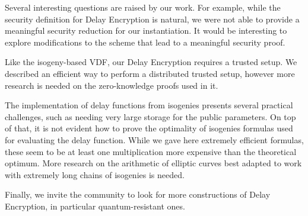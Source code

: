 \documentclass{llncs}
\begin{document}
Several interesting questions are raised by our work. %
For example, while the security definition for Delay Encryption is
natural, we were not able to provide a meaningful security reduction
for our instantiation. %
It would be interesting to explore modifications to the scheme that
lead to a meaningful security proof.

Like the isogeny-based VDF, our Delay Encryption requires a trusted
setup. %
We described an efficient way to perform a distributed trusted setup,
however more research is needed on the zero-knowledge proofs used in
it.

The implementation of delay functions from isogenies presents several
practical challenges, such as needing very large storage for the
public parameters. %
On top of that, it is not evident how to prove the optimality of
isogenies formulas used for evaluating the delay function. %
While we gave here extremely efficient formulas, these seem to be at
least one multiplication more expensive than the theoretical
optimum. %
More research on the arithmetic of elliptic curves best adapted to
work with extremely long chains of isogenies is needed.

Finally, we invite the community to look for more constructions of
Delay Encryption, in particular quantum-resistant ones.

\def\doi#1{\href{https://doi.org/#1}{\tt https://doi.org/\nolinkurl{#1}}}


\end{document}

